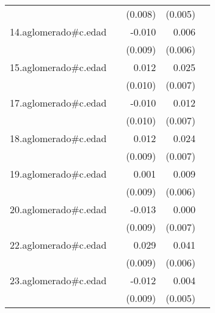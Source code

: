 {\begin{longtable}{l*{4}{D{.}{.}{-1}}}
            &                     &     (0.008)         &     (0.005)         &                     \\
\addlinespace
14.aglomerado#c.edad&                     &      -0.010         &       0.006         &                     \\
            &                     &     (0.009)         &     (0.006)         &                     \\
\addlinespace
15.aglomerado#c.edad&                     &       0.012         &       0.025\sym{***}&                     \\
            &                     &     (0.010)         &     (0.007)         &                     \\
\addlinespace
17.aglomerado#c.edad&                     &      -0.010         &       0.012         &                     \\
            &                     &     (0.010)         &     (0.007)         &                     \\
\addlinespace
18.aglomerado#c.edad&                     &       0.012         &       0.024\sym{***}&                     \\
            &                     &     (0.009)         &     (0.007)         &                     \\
\addlinespace
19.aglomerado#c.edad&                     &       0.001         &       0.009         &                     \\
            &                     &     (0.009)         &     (0.006)         &                     \\
\addlinespace
20.aglomerado#c.edad&                     &      -0.013         &       0.000         &                     \\
            &                     &     (0.009)         &     (0.007)         &                     \\
\addlinespace
22.aglomerado#c.edad&                     &       0.029\sym{**} &       0.041\sym{***}&                     \\
            &                     &     (0.009)         &     (0.006)         &                     \\
\addlinespace
23.aglomerado#c.edad&                     &      -0.012         &       0.004         &                     \\
            &                     &     (0.009)         &     (0.005)         &                     \\

\end{longtable}}
